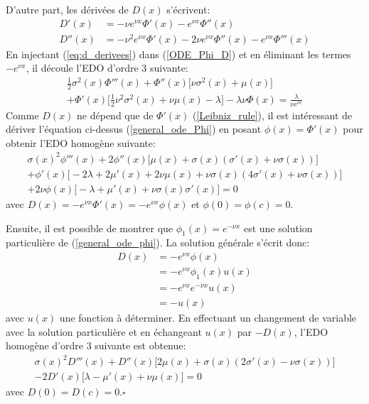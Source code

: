 D'autre part, les dérivées de $D(x)$ s'écrivent: 
\begin{equation}\label{eq:d_derivees}
    \begin{aligned}
        D'(x) &= -\nu e^{\nu x}\Phi'(x)-e^{\nu x}\Phi''(x) \\
        D''(x)&= -\nu^2e^{\nu x}\Phi'(x)-2\nu e^{\nu x}\Phi''(x)-e^{\nu x}\Phi'''(x)
    \end{aligned}
\end{equation}
En injectant (\ref{eq:d_derivees}) dans (\ref{ODE_Phi_D}) et en éliminant les termes $-e^{\nu x}$, il découle l'\acs{EDO} d'ordre 3 suivante: 
\begin{equation}\label{general_ode_Phi}
    \begin{aligned}
        \frac{1}{2}\sigma^2(x)\Phi'''(x)+\Phi''(x)\bigg[\nu\sigma^2(x)+\mu(x)\bigg]\\+\Phi'(x)\bigg[\frac{1}{2}\nu^2\sigma^2(x)+\nu\mu(x)-\lambda\bigg]-\lambda\nu\Phi(x)=\frac{\lambda}{\nu e^{\nu c}}
    \end{aligned}
\end{equation}
Comme $D(x)$ ne dépend que de $\Phi'(x)$ (\ref{Leibniz_rule}), il est intéressant de dériver l'équation ci-dessus (\ref{general_ode_Phi}) en posant $\phi(x)=\Phi'(x)$ pour obtenir l'\acs{EDO} homogène suivante:
\begin{equation}\label{general_ode_phi}
    \begin{aligned}
        \sigma(x)^2 \phi'''(x)+2 \phi''(x) \big[\mu(x)+\sigma(x) \left(\sigma'(x)+\nu  \sigma(x)\right)\big]\\+\phi'(x) \big[-2 \lambda +2 \mu'(x)+2 \nu\mu(x)+\nu  \sigma(x) \left(4 \sigma'(x)+\nu  \sigma(x)\right)\big]\\+2 \nu  \phi(x) \big[-\lambda +\mu'(x)+\nu  \sigma(x) \sigma'(x)\big]=0
    \end{aligned}
\end{equation}
avec $D(x)=-e^{\nu x}\Phi'(x)=-e^{\nu x}\phi(x)$ et $\phi(0)=\phi(c)=0$.

Ensuite, il est possible de montrer que $\phi_1(x)=e^{-\nu x}$ est une solution particulière de (\ref{general_ode_phi}). La solution générale s'écrit donc: 
\[
\begin{aligned}
    D(x)&=-e^{\nu x}\phi(x)\\
    &=-e^{\nu x}\phi_1(x)u(x)\\
    &=-e^{\nu x}e^{-\nu x}u(x)\\
    &=-u(x)
\end{aligned}
\]
avec $u(x)$ une fonction à déterminer. En effectuant un changement de variable avec la solution particulière et en échangeant $u(x)$ par $-D(x)$, l'\acs{EDO} homogène d'ordre 3 suivante est obtenue: 
\[
    \begin{aligned}
        \sigma(x)^2 D'''(x)+D''(x) \big[2 \mu(x)+\sigma(x)(2\sigma'(x)-\nu  \sigma(x))\big]\\-2D'(x)\big[\lambda-\mu'(x)+\nu\mu(x)\big]=0
    \end{aligned}
\]
avec $D(0)=D(c)=0$.\hfill$\square$\\

